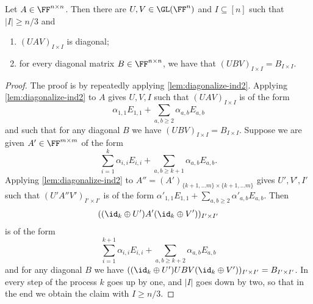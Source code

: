 \begin{lemma}\label{lem:diagonalize-ind}
    Let $A \in \FF^{n \times n}$. Then there are $U,V \in \GL(\FF^n)$ and $I \subseteq [n]$ such that $|I| \geq n/3$ and 
    \begin{enumerate}[\upshape (i)]
    \item $(UA V)_{I \times I}$ is diagonal;
    \item for every diagonal matrix $B \in \FF^{n \times n}$,  we have that $(U B V)_{I \times I} = B_{I \times I}$.
\end{enumerate}
\end{lemma}
\begin{proof}
    The proof is by repeatedly applying \autoref{lem:diagonalize-ind2}.
    Applying \autoref{lem:diagonalize-ind2} to $A$ gives $U,V,I$ such that $(UAV)_{I \times I}$ is of the form 
    \[
    \alpha_{1,1} E_{1,1} + \sum_{a,b\geq 2} \alpha_{a,b} E_{a,b}
    \]
    and such that for any diagonal $B$ we have $(UBV)_{I \times I} = B_{I \times I}$.
    Suppose we are given $A' \in \FF^{m \times m}$ of the form 
    \[
    \sum_{i=1}^k \alpha_{i,i} E_{i,i} + \sum_{a,b\geq k+1} \alpha_{a,b} E_{a,b}.
    \]
    Applying \autoref{lem:diagonalize-ind2} to $A'' = (A')_{\{k+1, \ldots m\} \times \{k+1, \ldots m\}}$ gives $U', V', I'$ such that $(U' A'' V')_{I' \times I'}$ is of the form $\alpha'_{1,1} E_{1,1} + \sum_{a,b\geq 2} \alpha'_{a,b} E_{a,b}$. Then 
    \[
    ((\id_k\oplus U') A' (\id_k\oplus V'))_{I' \times I'}
    \]
    is of the form 
    \[
    \sum_{i=1}^{k+1} \alpha_{i,i} E_{i,i} + \sum_{a,b\geq k+2} \alpha_{a,b} E_{a,b}
    \]
    and for any diagonal $B$ we have $((\id_k\oplus U')UBV(\id_k\oplus V'))_{I' \times I'} = B_{I' \times I'}$. In every step of the process $k$ goes up by one, and $|I|$ goes down by two, so that in the end we obtain the claim with $I \geq n/3$.
\end{proof}

